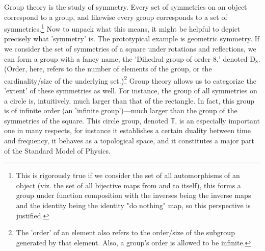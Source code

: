 \documentclass[11pt,a4paper]{article}
\begin{document}
Group theory is the study of symmetry. Every set of symmetries on an object correspond to a group, and likewise every group corresponds to a set of symmetries.\footnote[2]{This is rigorously true if we consider the set of all automorphisms of an object (viz. the set of all bijective maps from and to itself), this forms a group under function composition with the inverses being the inverse maps and the identity being the identity "do nothing" map, so this perspective is justified.} %
Now to unpack what this means, it might be helpful to depict precisely what 'symmetry' is. The prototypical example is geometric symmetry. If we consider the set of symmetries of a square under rotations and reflections, we can form a group with a fancy name, the 'Dihedral group of order 8,' denoted $\mathrm{D}_8$. %
(Order, here, refers to the number of elements of the group, or the cardinality/size of the underlying set.)\footnote[2]{The 'order' of an element also refers to the order/size of the subgroup generated by that element. Also, a group's order is allowed to be infinite.}
Group theory allows us to categorize the 'extent' of these symmetries as well. For instance, the group of all symmetries on a circle is, intuitively, much larger than that of the rectangle. In fact, this group is of infinite order (an 'infinite group')—much larger than the group of the symmetries of the square. This circle group, denoted $\mathbb{T}$, is an especially important one in many respects, for instance it establishes a certain duality between time and frequency, it behaves as a topological space, and it constitutes a major part of the Standard Model of Physics.
\end{document}
